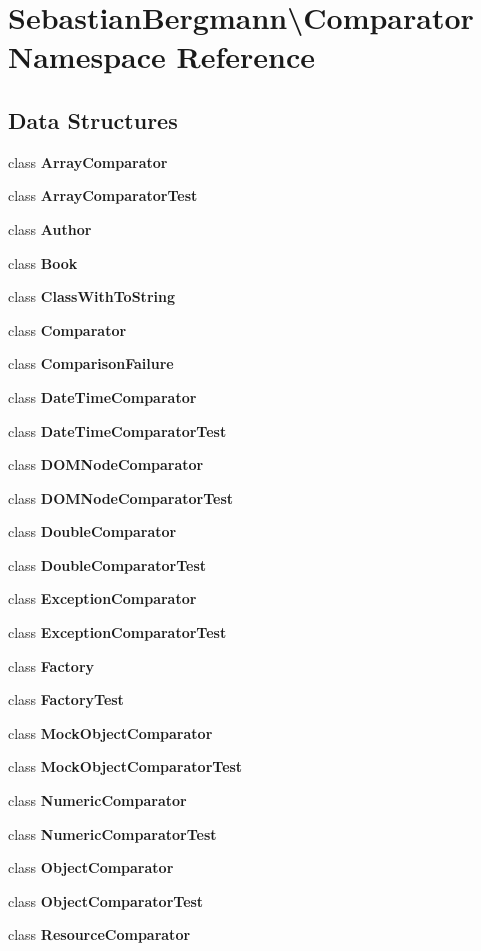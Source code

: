 \section{Sebastian\+Bergmann\textbackslash{}Comparator Namespace Reference}
\label{namespace_sebastian_bergmann_1_1_comparator}
\subsection*{Data Structures}
\begin{DoxyCompactItemize}
\item 
class {\bf Array\+Comparator}
\item 
class {\bf Array\+Comparator\+Test}
\item 
class {\bf Author}
\item 
class {\bf Book}
\item 
class {\bf Class\+With\+To\+String}
\item 
class {\bf Comparator}
\item 
class {\bf Comparison\+Failure}
\item 
class {\bf Date\+Time\+Comparator}
\item 
class {\bf Date\+Time\+Comparator\+Test}
\item 
class {\bf D\+O\+M\+Node\+Comparator}
\item 
class {\bf D\+O\+M\+Node\+Comparator\+Test}
\item 
class {\bf Double\+Comparator}
\item 
class {\bf Double\+Comparator\+Test}
\item 
class {\bf Exception\+Comparator}
\item 
class {\bf Exception\+Comparator\+Test}
\item 
class {\bf Factory}
\item 
class {\bf Factory\+Test}
\item 
class {\bf Mock\+Object\+Comparator}
\item 
class {\bf Mock\+Object\+Comparator\+Test}
\item 
class {\bf Numeric\+Comparator}
\item 
class {\bf Numeric\+Comparator\+Test}
\item 
class {\bf Object\+Comparator}
\item 
class {\bf Object\+Comparator\+Test}
\item 
class {\bf Resource\+Comparator}
\item 

\end{DoxyCompactItemize}
